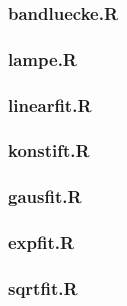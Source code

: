 \documentclass[12pt]{article}
\newcommand{\gra}[3][0.7]{
	\begin{minipage}[h!]{\textwidth}
		\centering
		\texttt{[image: figures/\#2.png]}
		\captionof{figure}{#3}
	\end{minipage}
	\vskip 30 pt
	}
\begin{document}
\subsubsection{bandluecke.R}\label{srcbandluecke}

\subsubsection{lampe.R}\label{srclampe}

\subsubsection{linearfit.R}\label{srclinearfit}

\subsubsection{konstift.R}\label{srckonstfit}

\subsubsection{gausfit.R}\label{srcgausfit}

\subsubsection{expfit.R}\label{srcexpfit}

\subsubsection{sqrtfit.R}\label{srcsqrtfit}




%


%
\end{document}
